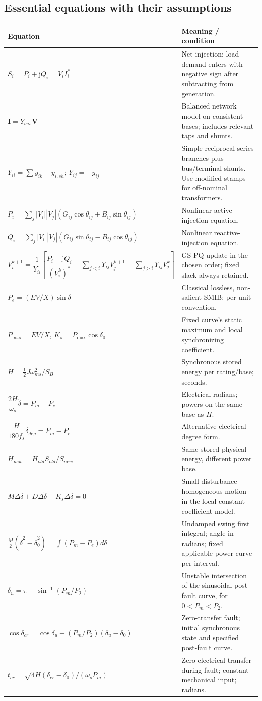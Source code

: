\documentclass[11pt,a4paper]{article}
\newcommand{\jj}{\mathrm j}
\begin{document}
\subsection{Essential equations with their assumptions}
\begin{center}\small\begin{longtable}{L{.43\textwidth}L{.48\textwidth}}
\toprule Equation & Meaning / condition\\\midrule\endhead
$S_i=P_i+\jj Q_i=V_iI_i^*$ & Net injection; load demand enters with negative sign after subtracting from generation.\\
$\boldsymbol I=Y_{bus}\boldsymbol V$ & Balanced network model on consistent bases; includes relevant taps and shunts.\\
$Y_{ii}=\sum y_{ik}+y_{i,sh}$; $Y_{ij}=-y_{ij}$ & Simple reciprocal series branches plus bus/terminal shunts. Use modified stamps for off-nominal transformers.\\
$P_i=\sum_j|V_i||V_j|(G_{ij}\cos\theta_{ij}+B_{ij}\sin\theta_{ij})$ & Nonlinear active-injection equation.\\
$Q_i=\sum_j|V_i||V_j|(G_{ij}\sin\theta_{ij}-B_{ij}\cos\theta_{ij})$ & Nonlinear reactive-injection equation.\\
$V_i^{k+1}=\dfrac{1}{Y_{ii}}\!\left[\dfrac{P_i-\jj Q_i}{(V_i^k)^*}-\sum_{j<i}Y_{ij}V_j^{k+1}-\sum_{j>i}Y_{ij}V_j^k\right]$ & GS PQ update in the chosen order; fixed slack always retained.\\
$P_e=(EV/X)\sin\delta$ & Classical lossless, non-salient SMIB; per-unit convention.\\
$P_{\max}=EV/X$, $K_s=P_{\max}\cos\delta_0$ & Fixed curve's static maximum and local synchronizing coefficient.\\
$H=\tfrac12J\omega_{ms}^2/S_B$ & Synchronous stored energy per rating/base; seconds.\\
$\dfrac{2H}{\omega_s}\ddot\delta=P_m-P_e$ & Electrical radians; powers on the same base as $H$.\\
$\dfrac{H}{180f_s}\ddot\delta_{deg}=P_m-P_e$ & Alternative electrical-degree form.\\
$H_{new}=H_{old}S_{old}/S_{new}$ & Same stored physical energy, different power base.\\
$M\Delta\ddot\delta+D\Delta\dot\delta+K_s\Delta\delta=0$ & Small-disturbance homogeneous motion in the local constant-coefficient model.\\
$\frac M2(\dot\delta^2-\dot\delta_0^2)=\int(P_m-P_e)d\delta$ & Undamped swing first integral; angle in radians; fixed applicable power curve per interval.\\
$\delta_u=\pi-\sin^{-1}(P_m/P_2)$ & Unstable intersection of the sinusoidal post-fault curve, for $0<P_m<P_2$.\\
$\cos\delta_{cr}=\cos\delta_u+(P_m/P_2)(\delta_u-\delta_0)$ & Zero-transfer fault; initial synchronous state and specified post-fault curve.\\
$t_{cr}=\sqrt{4H(\delta_{cr}-\delta_0)/(\omega_sP_m)}$ & Zero electrical transfer during fault; constant mechanical input; radians.\\\bottomrule
\end{longtable}\end{center}
\end{document}
